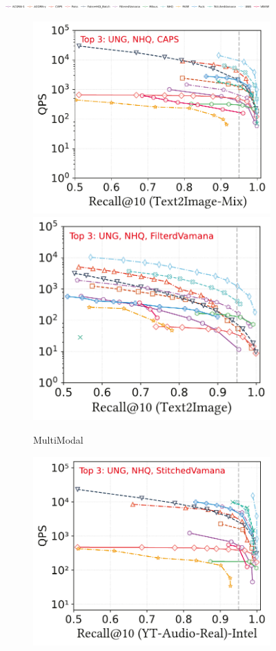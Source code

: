 \documentclass[sigconf, nonacm]{acmart}
\begin{document}
\begin{figure}[t]
	\centering
	
	\includegraphics[width=0.9\textwidth]{figures/exp/attribute_legend.pdf}
	
	
	\begin{subfigure}[b]{0.39\textwidth}
		\centering
		\includegraphics[width=0.495\linewidth]{figures/exp/attribute_multimodel.pdf}
		\hfill 
		\includegraphics[width=0.47\linewidth]{figures/exp/attribute_multimodel_1.pdf}
		\caption{MultiModal}
		\label{fig:attribute-multimodal} 
	\end{subfigure}
	\hfill %
	\begin{subfigure}[b]{0.39\textwidth}
		\centering
		\includegraphics[width=0.495\linewidth]{figures/exp/attribute_85.pdf}

\end{subfigure}
\end{figure}
\end{document}
